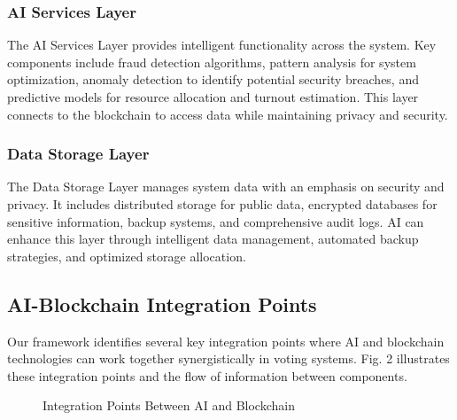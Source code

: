 \documentclass[conference]{IEEEtran}
\begin{document}
\subsubsection{AI Services Layer}
The AI Services Layer provides intelligent functionality across the system. Key components include fraud detection algorithms, pattern analysis for system optimization, anomaly detection to identify potential security breaches, and predictive models for resource allocation and turnout estimation. This layer connects to the blockchain to access data while maintaining privacy and security.

\subsubsection{Data Storage Layer}
The Data Storage Layer manages system data with an emphasis on security and privacy. It includes distributed storage for public data, encrypted databases for sensitive information, backup systems, and comprehensive audit logs. AI can enhance this layer through intelligent data management, automated backup strategies, and optimized storage allocation.

\subsection{AI-Blockchain Integration Points}
Our framework identifies several key integration points where AI and blockchain technologies can work together synergistically in voting systems. Fig. 2 illustrates these integration points and the flow of information between components.

\begin{figure}[!htb]
\centering
{}
\caption{Integration Points Between AI and Blockchain}
\label{fig:integration}
\end{figure}
\end{document}
